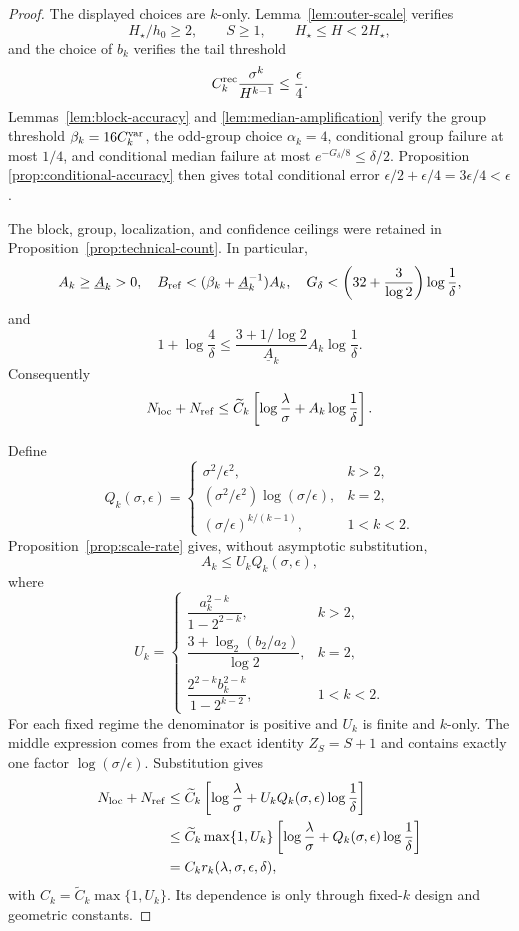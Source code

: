\begin{proof}
The displayed choices are $k$-only.  Lemma~\ref{lem:outer-scale} verifies
\[
 H_\star/h_0\geq2,\qquad S\geq1,\qquad H_\star\leq H<2H_\star,
\]
and the choice of $b_k$ verifies the tail threshold
\[
 C_k^{\rm rec}\frac{\sigma^k}{H^{k-1}}\leq\frac\epsilon4.
\]
Lemmas~\ref{lem:block-accuracy} and \ref{lem:median-amplification} verify the
group threshold $\beta_k=16C_k^{\rm var}$, the odd-group choice
$\alpha_k=4$, conditional group failure at most $1/4$, and conditional
median failure at most $e^{-G_\delta/8}\leq\delta/2$.  Proposition~
\ref{prop:conditional-accuracy} then gives total conditional error
$\epsilon/2+\epsilon/4=3\epsilon/4<\epsilon$.

The block, group, localization, and confidence ceilings were retained in
Proposition~\ref{prop:technical-count}.  In particular,
\[
 A_k\geq\underline A_k>0,
 \quad B_{\rm ref}<(\beta_k+\underline A_k^{-1})A_k,
 \quad G_\delta<\left(32+\frac3{\log2}\right)\log\frac1\delta,
\]
and
\[
 1+\log\frac4\delta
 \leq\frac{3+1/\log2}{\underline A_k}
 A_k\log\frac1\delta.
\]
Consequently
\[
 N_{\rm loc}+N_{\rm ref}
 \leq\widetilde C_k\left[
 \log\frac\lambda\sigma+A_k\log\frac1\delta\right].
\]

Define
\[
 Q_k(\sigma,\epsilon)=
 \begin{cases}
 \sigma^2/\epsilon^2,&k>2,\\
 (\sigma^2/\epsilon^2)\log(\sigma/\epsilon),&k=2,\\
 (\sigma/\epsilon)^{k/(k-1)},&1<k<2.
 \end{cases}
\]
Proposition~\ref{prop:scale-rate} gives, without asymptotic substitution,
\[
 A_k\leq U_kQ_k(\sigma,\epsilon),
\]
where
\[
 U_k=
 \begin{cases}
 \dfrac{a_k^{2-k}}{1-2^{2-k}},&k>2,\\[0.8em]
 \dfrac{3+\log_2(b_2/a_2)}{\log2},&k=2,\\[0.8em]
 \dfrac{2^{2-k}b_k^{2-k}}{1-2^{k-2}},&1<k<2.
 \end{cases}
\]
For each fixed regime the denominator is positive and $U_k$ is finite and
$k$-only.  The middle expression comes from the exact identity $Z_S=S+1$
and contains exactly one factor $\log(\sigma/\epsilon)$.  Substitution gives
\[
\begin{aligned}
 N_{\rm loc}+N_{\rm ref}
 &\leq\widetilde C_k\left[
 \log\frac\lambda\sigma+U_kQ_k(\sigma,\epsilon)\log\frac1\delta\right]\\
 &\leq\widetilde C_k\max\{1,U_k\}
 \left[\log\frac\lambda\sigma
 +Q_k(\sigma,\epsilon)\log\frac1\delta\right]\\
 &=C_kr_k(\lambda,\sigma,\epsilon,\delta),
\end{aligned}
\]
with $C_k=\widetilde C_k\max\{1,U_k\}$.  Its dependence is only through
fixed-$k$ design and geometric constants.


\end{proof}

